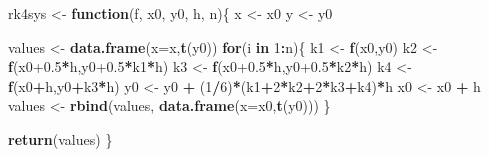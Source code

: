 \documentclass[
]{book}
\newenvironment{Shaded}{\begin{snugshade}}{\end{snugshade}}
\newcommand{\AttributeTok}[1]{\textcolor[rgb]{0.13,0.29,0.53}{#1}}
\newcommand{\ControlFlowTok}[1]{\textcolor[rgb]{0.13,0.29,0.53}{\textbf{#1}}}
\newcommand{\DecValTok}[1]{\textcolor[rgb]{0.00,0.00,0.81}{#1}}
\newcommand{\FloatTok}[1]{\textcolor[rgb]{0.00,0.00,0.81}{#1}}
\newcommand{\FunctionTok}[1]{\textcolor[rgb]{0.13,0.29,0.53}{\textbf{#1}}}
\newcommand{\NormalTok}[1]{#1}
\newcommand{\OtherTok}[1]{\textcolor[rgb]{0.56,0.35,0.01}{#1}}
\newcommand{\SpecialCharTok}[1]{\textcolor[rgb]{0.81,0.36,0.00}{\textbf{#1}}}
\theoremstyle{definition}
\theoremstyle{definition}
\theoremstyle{definition}
\theoremstyle{definition}
\theoremstyle{remark}
\begin{document}
\begin{Shaded}
\begin{Highlighting}[]
\NormalTok{rk4sys }\OtherTok{\textless{}{-}} \ControlFlowTok{function}\NormalTok{(f, x0, y0, h, n)\{}
\NormalTok{  x }\OtherTok{\textless{}{-}}\NormalTok{ x0}
\NormalTok{  y }\OtherTok{\textless{}{-}}\NormalTok{ y0}
  
\NormalTok{  values }\OtherTok{\textless{}{-}} \FunctionTok{data.frame}\NormalTok{(}\AttributeTok{x=}\NormalTok{x,}\FunctionTok{t}\NormalTok{(y0))}
  \ControlFlowTok{for}\NormalTok{(i }\ControlFlowTok{in} \DecValTok{1}\SpecialCharTok{:}\NormalTok{n)\{}
\NormalTok{    k1 }\OtherTok{\textless{}{-}} \FunctionTok{f}\NormalTok{(x0,y0)}
\NormalTok{    k2 }\OtherTok{\textless{}{-}} \FunctionTok{f}\NormalTok{(x0}\FloatTok{+0.5}\SpecialCharTok{*}\NormalTok{h,y0}\FloatTok{+0.5}\SpecialCharTok{*}\NormalTok{k1}\SpecialCharTok{*}\NormalTok{h)}
\NormalTok{    k3 }\OtherTok{\textless{}{-}} \FunctionTok{f}\NormalTok{(x0}\FloatTok{+0.5}\SpecialCharTok{*}\NormalTok{h,y0}\FloatTok{+0.5}\SpecialCharTok{*}\NormalTok{k2}\SpecialCharTok{*}\NormalTok{h)}
\NormalTok{    k4 }\OtherTok{\textless{}{-}} \FunctionTok{f}\NormalTok{(x0}\SpecialCharTok{+}\NormalTok{h,y0}\SpecialCharTok{+}\NormalTok{k3}\SpecialCharTok{*}\NormalTok{h)}
\NormalTok{    y0 }\OtherTok{\textless{}{-}}\NormalTok{ y0 }\SpecialCharTok{+}\NormalTok{ (}\DecValTok{1}\SpecialCharTok{/}\DecValTok{6}\NormalTok{)}\SpecialCharTok{*}\NormalTok{(k1}\SpecialCharTok{+}\DecValTok{2}\SpecialCharTok{*}\NormalTok{k2}\SpecialCharTok{+}\DecValTok{2}\SpecialCharTok{*}\NormalTok{k3}\SpecialCharTok{+}\NormalTok{k4)}\SpecialCharTok{*}\NormalTok{h}
\NormalTok{    x0 }\OtherTok{\textless{}{-}}\NormalTok{ x0 }\SpecialCharTok{+}\NormalTok{ h}
\NormalTok{    values }\OtherTok{\textless{}{-}} \FunctionTok{rbind}\NormalTok{(values, }\FunctionTok{data.frame}\NormalTok{(}\AttributeTok{x=}\NormalTok{x0,}\FunctionTok{t}\NormalTok{(y0)))}
\NormalTok{  \}}
  
  \FunctionTok{return}\NormalTok{(values)}
\NormalTok{\}}
\end{Highlighting}
\end{Shaded}
\end{document}
